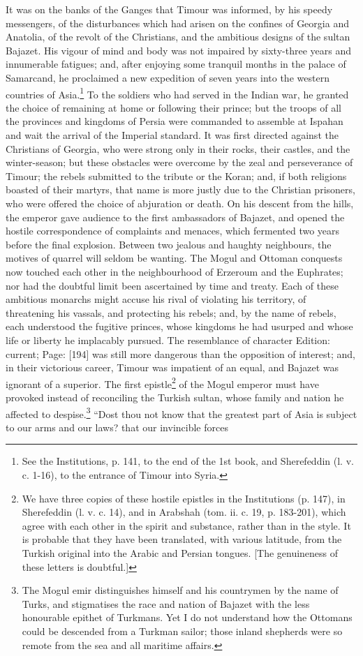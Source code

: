 It was on the banks of the Ganges that Timour was informed, by his speedy messengers, of the disturbances which had arisen on the confines of Georgia and Anatolia, of the revolt of the Christians, and the ambitious designs of the sultan Bajazet. His vigour of mind and body was not impaired by sixty-three years and innumerable fatigues; and, after enjoying some tranquil months in the palace of Samarcand, he proclaimed a new expedition of seven years into the western countries of Asia.\footnote{See the Institutions, p. 141, to the end of the 1st book, and Sherefeddin (l. v. c. 1-16), to the entrance of Timour into Syria.} To the soldiers who had served in the Indian war, he granted the choice of remaining at home or following their prince; but the troops of all the provinces and kingdoms of Persia were commanded to assemble at Ispahan and wait the arrival of the Imperial standard. It was first directed against the Christians of Georgia, who were strong only in their rocks, their castles, and the winter-season; but these obstacles were overcome by the zeal and perseverance of Timour; the rebels submitted to the tribute or the Koran; and, if both religions boasted of their martyrs, that name is more justly due to the Christian prisoners, who were offered the choice of abjuration or death. On his descent from the hills, the emperor gave audience to the first ambassadors of Bajazet, and opened the hostile correspondence of complaints and menaces, which fermented two years before the final explosion. Between two jealous and haughty neighbours, the motives of quarrel will seldom be wanting. The Mogul and Ottoman conquests now touched each other in the neighbourhood of Erzeroum and the Euphrates; nor had the doubtful limit been ascertained by time and treaty. Each of these ambitious monarchs might accuse his rival of violating his territory, of threatening his vassals, and protecting his rebels; and, by the name of rebels, each understood the fugitive princes, whose kingdoms he had usurped and whose life or liberty he implacably pursued. The resemblance of character Edition: current; Page: [194] was still more dangerous than the opposition of interest; and, in their victorious career, Timour was impatient of an equal, and Bajazet was ignorant of a superior. The first epistle\footnote{We have three copies of these hostile epistles in the Institutions (p. 147), in Sherefeddin (l. v. c. 14), and in Arabshah (tom. ii. c. 19, p. 183-201), which agree with each other in the spirit and substance, rather than in the style. It is probable that they have been translated, with various latitude, from the Turkish original into the Arabic and Persian tongues. [The genuineness of these letters is doubtful.]} of the Mogul emperor must have provoked instead of reconciling the Turkish sultan, whose family and nation he affected to despise.\footnote{The Mogul emir distinguishes himself and his countrymen by the name of Turks, and stigmatises the race and nation of Bajazet with the less honourable epithet of Turkmans. Yet I do not understand how the Ottomans could be descended from a Turkman sailor; those inland shepherds were so remote from the sea and all maritime affairs.} \texthebrew{“}Dost thou not know that the greatest part of Asia is subject to our arms and our laws? that our invincible forces 